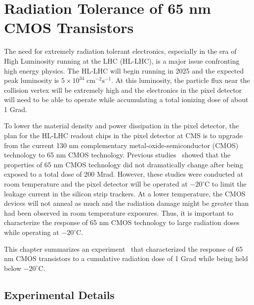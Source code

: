 \chapter{Radiation Tolerance of 65 nm CMOS Transistors}
\label{ch:RadStudies}

The need for extremely radiation tolerant electronics, especially in the era of High Luminosity running at the LHC (HL-LHC), is a major issue confronting high energy physics. The HL-LHC will begin running in 2025 and the expected peak luminosity is $5\times10^{34}\; \mathrm{cm}^{-2}\mathrm{s}^{-1}$. At this luminosity, the particle flux near the collision vertex will be extremely high and the electronics in the pixel detector will need to be able to operate while accumulating a total ionizing dose of about 1 Grad. 

To lower the material density and power dissipation in the pixel detector, the plan for the HL-LHC readout chips in the pixel detector at CMS is to upgrade from the current 130 nm complementary metal-oxide-semiconductor (CMOS) technology to 65 nm CMOS technology. Previous studies~\cite{CMOSXrayRadiation} showed that the properties of 65 nm CMOS technology did not dramatically change after being exposed to a total dose of 200 Mrad. However, these studies were conducted at room temperature and the pixel detector will be operated at $-20^{\circ}\mathrm{C}$ to limit the leakage current in the silicon strip trackers. At a lower temperature, the CMOS devices will not anneal as much and the radiation damage might be greater than had been observed in room temperature exposures. Thus, it is important to characterize the response of 65 nm CMOS technology to large radiation doses while operating at $-20^{\circ}\mathrm{C}$.

This chapter summarizes an experiment~\cite{CMOSRadiation} that characterized the response of 65 nm CMOS transistors to a cumulative radiation dose of 1 Grad while being held below $-20^{\circ}\mathrm{C}$.

\section{Experimental Details}

